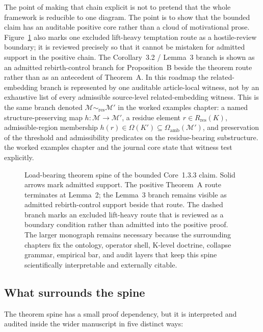 The point of making that chain explicit is not to pretend that the whole
framework is reducible to one diagram. The point is to show that the bounded
claim has an auditable positive core rather than a cloud of motivational prose.
Figure~\ref{fig:oc13-theorem-spine} also marks one excluded lift-heavy
temptation route as a hostile-review boundary; it is reviewed precisely so that
it cannot be mistaken for admitted support in the positive chain. The
Corollary~3.2 / Lemma~3 branch is shown as an admitted rebirth-control branch
for Proposition~B beside the theorem route rather than as an antecedent of
Theorem~A. In this roadmap the related-embedding branch is represented by one
auditable article-local witness, not by an exhaustive list of every admissible
source-level related-embedding witness. This is the same branch denoted
\(\mathcal{M}\sim_{\mathrm{res}}\mathcal{M}'\) in
the worked examples chapter: a named structure-preserving map
\(h:\mathcal{M}\to\mathcal{M}'\), a residue element
\(r\in R_{\mathrm{res}}(K)\),
admissible-region membership
\(h(r)\in\Omega(K')\subseteq\Omega_{\mathrm{amb}}(\mathcal{M}')\),
and preservation of the threshold and admissibility predicates on the
residue-bearing substructure. the worked examples chapter and
the journal core state that witness test explicitly.

\begin{figure}[htbp]
\centering

\caption{Load-bearing theorem spine of the bounded Core~1.3.3 claim. Solid arrows
mark admitted support. The positive Theorem~A route terminates at Lemma~2; the
Lemma~3 branch remains visible as admitted rebirth-control support beside that
route. The dashed branch marks an excluded lift-heavy route that is reviewed as
a boundary condition rather than admitted into the positive proof. The larger
monograph remains necessary because the surrounding chapters fix the ontology,
operator shell, K-level doctrine, collapse grammar, empirical bar, and audit
layers that keep this spine scientifically interpretable and externally
citable.}
\label{fig:oc13-theorem-spine}
\end{figure}

\subsection{What surrounds the spine}

The theorem spine has a small proof dependency, but it is interpreted and
audited inside the wider manuscript in five distinct ways:

